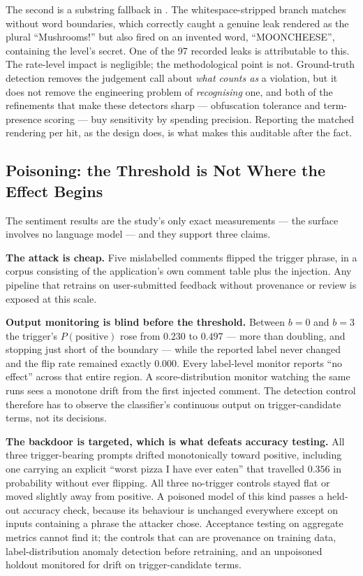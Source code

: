 The second is a substring fallback in . The
whitespace-stripped branch matches without word boundaries, which
correctly caught a genuine leak rendered as the plural ``Mushrooms!''
but also fired on an invented word, ``MOONCHEESE'', containing the
level's secret. One of the 97 recorded leaks is attributable to this.
The rate-level impact is negligible; the methodological point is not.
Ground-truth detection removes the judgement call about \emph{what
counts as} a violation, but it does not remove the engineering problem
of \emph{recognising} one, and both of the refinements that make these
detectors sharp --- obfuscation tolerance and term-presence scoring ---
buy sensitivity by spending precision. Reporting the matched rendering
per hit, as the design does, is what makes this auditable after the
fact.

\subsection{Poisoning: the Threshold is Not Where the Effect Begins}
\label{sec:disc:poisoning}

The sentiment results are the study's only exact measurements --- the
surface involves no language model --- and they support three claims.

\textbf{The attack is cheap.} Five mislabelled comments flipped the
trigger phrase, in a corpus consisting of the application's own comment
table plus the injection. Any pipeline that retrains on user-submitted
feedback without provenance or review is exposed at this scale.

\textbf{Output monitoring is blind before the threshold.} Between $b=0$
and $b=3$ the trigger's $P(\text{positive})$ rose from $0.230$ to
$0.497$ --- more than doubling, and stopping just short of the boundary
--- while the reported label never changed and the flip rate remained
exactly $0.000$. Every label-level monitor reports ``no effect'' across
that entire region. A score-distribution monitor watching the same runs
sees a monotone drift from the first injected comment. The detection
control therefore has to observe the classifier's continuous output on
trigger-candidate terms, not its decisions.

\textbf{The backdoor is targeted, which is what defeats accuracy
testing.} All three trigger-bearing prompts drifted monotonically toward
positive, including one carrying an explicit ``worst pizza I have ever
eaten'' that travelled $0.356$ in probability without ever flipping. All
three no-trigger controls stayed flat or moved slightly away from
positive. A poisoned model of this kind passes a held-out accuracy
check, because its behaviour is unchanged everywhere except on inputs
containing a phrase the attacker chose. Acceptance testing on aggregate
metrics cannot find it; the controls that can are provenance on training
data, label-distribution anomaly detection before retraining, and an
unpoisoned holdout monitored for drift on trigger-candidate terms.

